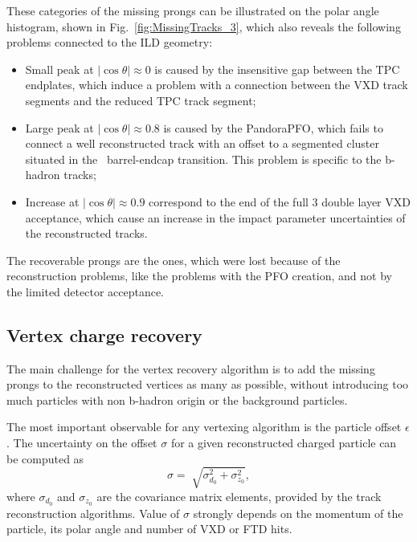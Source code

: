 These categories of the missing prongs can be illustrated on the polar angle histogram, shown in Fig.~\ref{fig:MissingTracks_3}, which also reveals the following problems connected to the ILD geometry:
\begin{itemize}
\item Small peak at $|\cos\theta| \approx 0$ is caused by the insensitive gap between the TPC endplates, which induce a problem with a connection between the VXD track segments and the reduced TPC track segment;
\item Large peak at $|\cos\theta| \approx 0.8$ is caused by the PandoraPFO, which fails to connect a well reconstructed track with an offset to a segmented cluster situated in the \ecal\ barrel-endcap transition. This problem is specific to the b-hadron tracks;
\item Increase at $|\cos\theta| \approx 0.9$ correspond to the end of the full 3 double layer VXD acceptance, which cause an increase in the impact parameter uncertainties of the reconstructed tracks. %
\end{itemize}

The recoverable prongs are the ones, which were lost because of the reconstruction problems, like the problems with the PFO creation, and not by the limited detector acceptance.  

\subsection{Vertex charge recovery}
\label{sec:VtxRecovery}
The main challenge for the vertex recovery algorithm is to add the missing prongs to the reconstructed vertices as many as possible, without introducing too much particles with non b-hadron origin or the background particles. 

The most important observable for any vertexing algorithm is the particle offset $\epsilon$.
The uncertainty on the offset $\sigma$ for a given reconstructed charged particle can be computed as 
\begin{equation}
	\sigma = \sqrt[]{\sigma_{d_{0}}^2 + \sigma_{z_0}^2},
\end{equation}
where $\sigma_{d_{0}}$ and $\sigma_{z_0}$ are the covariance matrix elements, provided by the track reconstruction algorithms. 
Value of $\sigma$ strongly depends on the momentum of the particle, its polar angle and number of VXD or FTD hits. 

